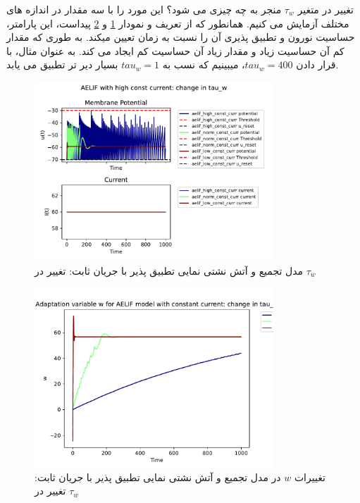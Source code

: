 \documentclass{article}
\begin{document}
                تغییر در متغیر 
                $\tau_w$ 
                منجر به چه چیزی می شود؟ این مورد را با سه مقدار در اندازه های مختلف آزمایش می کنیم.
                همانطور که از تعریف و نمودار
                \ref{fig:aelif-const-curr-change-tau_w} و 
                \ref{fig:aelif-w-const-curr-change-tau_w}
                پیداست، این پارامتر، حساسیت نورون و تطبیق پذیری آن را نسبت به زمان تعیین میکند. به طوری که مقدار کم آن حساسیت زیاد و مقدار زیاد آن حساسیت کم ایجاد می کند. به عنوان مثال، با قرار دادن 
                $tau_w=400$، 
                میبینیم که نسب به 
                $tau_w=1$ 
                بسیار دیر تر تطبیق می یابد.
                \begin{figure}[H]
                    \centering
                    \includegraphics[width=0.8\textwidth]{plots/AELIF with high const current: change in tau_w.pdf} 
                    \caption{مدل تجمیع و آتش نشتی نمایی تطبیق پذیر با جریان ثابت: تغییر در $\tau_w$}
                    \label{fig:aelif-const-curr-change-tau_w}
                \end{figure}
                \begin{figure}[H]
                    \centering
                    \includegraphics[width=0.8\textwidth]{plots/Adaptation variable w for AELIF model with constant current: change in tau_w.pdf} 
                    \caption{تغییرات $w$ در مدل تجمیع و آتش نشتی نمایی تطبیق پذیر با جریان ثابت: تغییر در $\tau_w$}
                    \label{fig:aelif-w-const-curr-change-tau_w}
                \end{figure}
\end{document}
